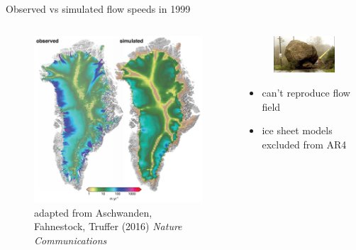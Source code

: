 \documentclass[hide notes,intlimits]{beamer}
\begin{document}
\begin{frame}{Observed vs simulated flow speeds in 1999}
  \begin{columns}[c]
    \begin{column}{.6\linewidth}
    \begin{figure}
      \includegraphics[width=\textwidth]{gris-obs-exp-old-1999}
      \\ \tiny{adapted from Aschwanden, Fahnestock, Truffer (2016) \textit{Nature Communications}}
    \end{figure}
    \end{column}
    \begin{column}{.4\linewidth}
      \begin{figure}
        \includegraphics[width=\textwidth]{roadblocks}
      \end{figure}
      \begin{itemize}
      \item can't reproduce flow field
      \item ice sheet models excluded from AR4
      \end{itemize}
    \end{column}
  \end{columns}
\end{frame}
\end{document}
